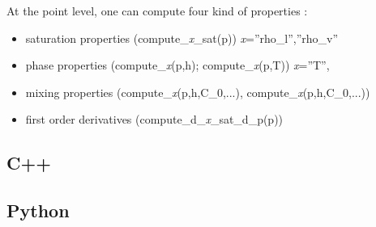 \documentclass[12pt]{article}
\begin{document}
At the point level, one can compute four kind of properties :
\begin{itemize}
\item saturation properties (compute\_{\em x}\_sat(p)) {\em x}=''rho\_l'',''rho\_v''
\item phase properties (compute\_{\em x}(p,h); compute\_{\em x}(p,T)) {\em x}=''T'', 
\item mixing properties (compute\_{\em x}(p,h,C\_0,...), compute\_{\em x}(p,h,C\_0,...))
\item first order derivatives (compute\_d\_{\em x}\_sat\_d\_p(p))
\end{itemize}

\subsection{C++}
\subsection{Python}
\end{document}
